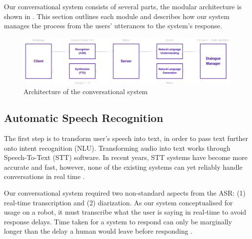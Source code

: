 \documentclass[hidelinks, 11pt]{article}
\begin{document}
Our conversational system consists of several parts, the modular architecture is shown in . This section outlines each module and describes how our system manages the process from the users' utterances to the system's response.

\begin{figure}
  \includegraphics*[width=\columnwidth]{images/system_graph.png}
  \caption{Architecture of the conversational system}
  \label{fig:system_architecture}
\end{figure}

\subsection{Automatic Speech Recognition}
\label{subsec:asr}

The first step is to transform user's speech into text, in order to pass text further onto intent recognition (NLU). Transforming audio into text works through Speech-To-Text (STT) software. In recent years, STT systems have become more accurate and fast, however, none of the existing systems can yet reliably handle conversations in real time \cite{addlesee_comprehensive_2020}.

Our conversational system required two non-standard aspects from the ASR: (1) real-time transcription and (2) diarization. As our system conceptualised for usage on a robot, it must transcribe what the user is saying in real-time to avoid response delays. Time taken for a system to respond can only be marginally longer than the delay a human would leave before responding .
\end{document}
